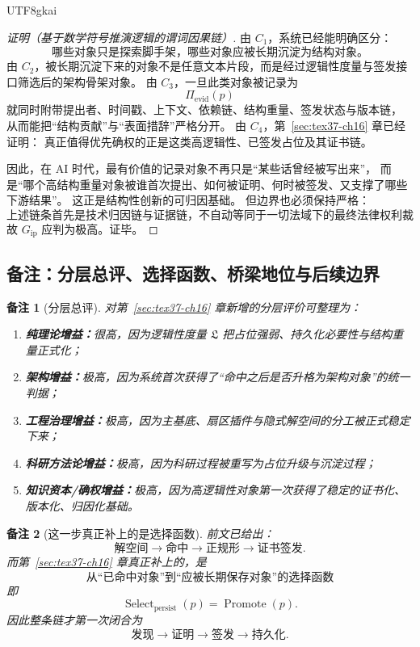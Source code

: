 \documentclass[12pt]{article}
\newtheorem{remark}{备注}[section]
\newcommand{\Select}{\operatorname{Select}}
\newcommand{\Promote}{\operatorname{Promote}}
\begin{document}
\begin{CJK*}{UTF8}{gkai}
\begin{proof}[证明（基于数学符号推演逻辑的谓词因果链）]
由 $C_1$，系统已经能明确区分：
\[
  \text{哪些对象只是探索脚手架，哪些对象应被长期沉淀为结构对象。}
\]
由 $C_2$，被长期沉淀下来的对象不是任意文本片段，而是经过逻辑性度量与签发接口筛选后的架构骨架对象。
由 $C_3$，一旦此类对象被记录为
\[
  \Pi_{\mathrm{evid}}(p)
\]
就同时附带提出者、时间戳、上下文、依赖链、结构重量、签发状态与版本链，
从而能把“结构贡献”与“表面措辞”严格分开。
由 $C_4$，第~\ref{sec:tex37-ch16} 章已经证明：
真正值得优先确权的正是这类高逻辑性、已签发占位及其证书链。

因此，在 AI 时代，最有价值的记录对象不再只是“某些话曾经被写出来”，
而是“哪个高结构重量对象被谁首次提出、如何被证明、何时被签发、又支撑了哪些下游结果”。
这正是结构性创新的可归因基础。
但边界也必须保持严格：
\[
  \boxed{
    \text{上述链条首先是技术归因链与证据链，不自动等同于一切法域下的最终法律权利裁决。}
  }
\]
故 $G_{\mathrm{ip}}$ 应判为极高。证毕。
\end{proof}

\subsection{备注：分层总评、选择函数、桥梁地位与后续边界}
\label{subsec:tex37-ch17-remarks}

\begin{remark}[分层总评]
对第~\ref{sec:tex37-ch16} 章新增的分层评价可整理为：
\begin{enumerate}
  \item \textbf{纯理论增益：}很高，因为逻辑性度量 $\mathfrak L$ 把占位强弱、持久化必要性与结构重量正式化；
  \item \textbf{架构增益：}极高，因为系统首次获得了“命中之后是否升格为架构对象”的统一判据；
  \item \textbf{工程治理增益：}极高，因为主基底、扇区插件与隐式解空间的分工被正式稳定下来；
  \item \textbf{科研方法论增益：}极高，因为科研过程被重写为占位升级与沉淀过程；
  \item \textbf{知识资本/确权增益：}极高，因为高逻辑性对象第一次获得了稳定的证书化、版本化、归因化基础。
\end{enumerate}
\end{remark}

\begin{remark}[这一步真正补上的是选择函数]
前文已给出：
\[
  \text{解空间}
  \to
  \text{命中}
  \to
  \text{正规形}
  \to
  \text{证书签发}.
\]
而第~\ref{sec:tex37-ch16} 章真正补上的，是
\[
  \boxed{
    \text{从“已命中对象”到“应被长期保存对象”的选择函数}
  }
\]
即
\[
  \Select_{\mathrm{persist}}(p)=\Promote(p).
\]
因此整条链才第一次闭合为
\[
  \text{发现}
  \to
  \text{证明}
  \to
  \text{签发}
  \to
  \text{持久化}.
\]
\end{remark}


\end{CJK*}
\end{document}
